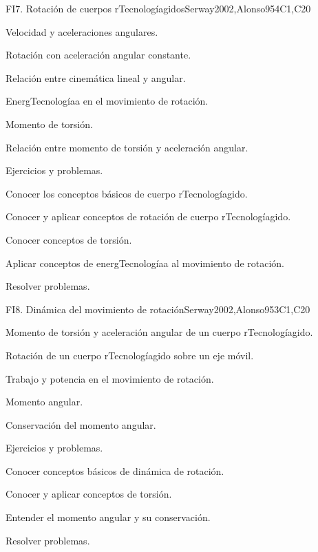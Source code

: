 \begin{syllabus}
\begin{unit}{FI7. Rotación de cuerpos rTecnologíagidos}{}{Serway2002,Alonso95}{4}{C1,C20}
\begin{topics}
      \item Velocidad y aceleraciones angulares.
      \item Rotación con aceleración angular constante.
      \item Relación entre cinemática lineal y angular.
      \item EnergTecnologíaa en el movimiento de rotación.
      \item Momento de torsión.
      \item Relación entre momento de torsión y aceleración angular.
      \item Ejercicios y problemas.
   \end{topics}

   \begin{learningoutcomes}
      \item Conocer los conceptos básicos de cuerpo rTecnologíagido.
      \item Conocer y aplicar conceptos de rotación de cuerpo rTecnologíagido.
      \item Conocer conceptos de torsión.
      \item Aplicar conceptos de energTecnologíaa al movimiento de rotación.
      \item Resolver problemas.
   \end{learningoutcomes}
\end{unit}

\begin{unit}{FI8. Dinámica del movimiento de rotación}{}{Serway2002,Alonso95}{3}{C1,C20}
\begin{topics}
      \item Momento de torsión y aceleración angular de un cuerpo rTecnologíagido.
      \item Rotación de un cuerpo rTecnologíagido sobre un eje móvil.
      \item Trabajo y potencia en el movimiento de rotación.
      \item Momento angular.
      \item Conservación del momento angular.
      \item Ejercicios y problemas.
    \end{topics}

   \begin{learningoutcomes}
      \item Conocer conceptos básicos de dinámica de rotación.
      \item Conocer y aplicar conceptos de torsión.
      \item Entender el momento angular y su conservación.
      \item Resolver problemas.
   \end{learningoutcomes}
\end{unit}

\begin{coursebibliography}
\end{coursebibliography}
\end{syllabus}

